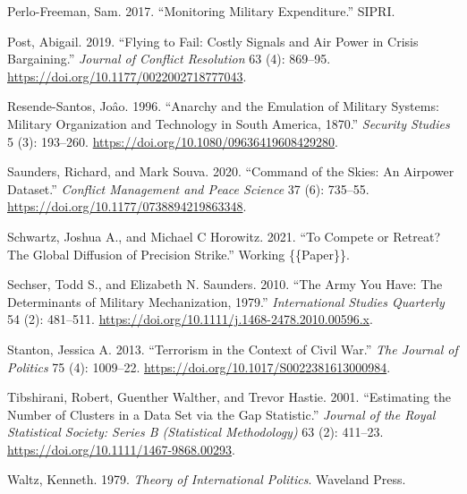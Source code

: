 \documentclass[
]{article}
\newlength{\cslhangindent}
\newlength{\cslentryspacingunit} %
\newenvironment{CSLReferences}[2] %
 {%
  \setlength{\parindent}{0pt}
  \ifodd #1
  \let\oldpar\par
  \def\par{\hangindent=\cslhangindent\oldpar}
  \fi
  \setlength{\parskip}{#2\cslentryspacingunit}
 }%
 {}
\begin{document}
\begin{CSLReferences}{1}{0}
\leavevmode{}%
Perlo-Freeman, Sam. 2017. {``Monitoring Military Expenditure.''} {SIPRI}.

\leavevmode{}%
Post, Abigail. 2019. {``Flying to {Fail}: {Costly Signals} and {Air Power} in {Crisis Bargaining}.''} \emph{Journal of Conflict Resolution} 63 (4): 869--95. \url{https://doi.org/10.1177/0022002718777043}.

\leavevmode{}%
Resende-Santos, Joâo. 1996. {``Anarchy and the Emulation of Military Systems: {Military} Organization and Technology in {South America}, 1870.''} \emph{Security Studies} 5 (3): 193--260. \url{https://doi.org/10.1080/09636419608429280}.

\leavevmode{}%
Saunders, Richard, and Mark Souva. 2020. {``Command of the {Skies}: {An Airpower Dataset}.''} \emph{Conflict Management and Peace Science} 37 (6): 735--55. \url{https://doi.org/10.1177/0738894219863348}.

\leavevmode{}%
Schwartz, Joshua A., and Michael C Horowitz. 2021. {``To {Compete} or {Retreat}? {The Global Diffusion} of {Precision Strike}.''} Working \{\{Paper\}\}.

\leavevmode{}%
Sechser, Todd S., and Elizabeth N. Saunders. 2010. {``The {Army You Have}: {The Determinants} of {Military Mechanization}, 1979.''} \emph{International Studies Quarterly} 54 (2): 481--511. \url{https://doi.org/10.1111/j.1468-2478.2010.00596.x}.

\leavevmode{}%
Stanton, Jessica A. 2013. {``Terrorism in the {Context} of {Civil War}.''} \emph{The Journal of Politics} 75 (4): 1009--22. \url{https://doi.org/10.1017/S0022381613000984}.

\leavevmode{}%
Tibshirani, Robert, Guenther Walther, and Trevor Hastie. 2001. {``Estimating the Number of Clusters in a Data Set via the Gap Statistic.''} \emph{Journal of the Royal Statistical Society: Series B (Statistical Methodology)} 63 (2): 411--23. \url{https://doi.org/10.1111/1467-9868.00293}.

\leavevmode{}%
Waltz, Kenneth. 1979. \emph{Theory of {International Politics}}. {Waveland Press}.


\end{CSLReferences}
\end{document}
